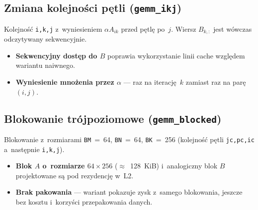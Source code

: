 \documentclass[a4paper,12pt]{book} %
\newcommand{\kod}[1]{\texttt{#1}}
\begin{document}
\subsection{Zmiana kolejności pętli (\kod{gemm\_ikj})}
Kolejność \kod{i,k,j} z~wyniesieniem $\alpha A_{ik}$ przed pętlę po~$j$. Wiersz
$B_{k,:}$ jest wówczas odczytywany sekwencyjnie.
\begin{itemize}
\item \textbf{Sekwencyjny dostęp do $B$} poprawia wykorzystanie linii cache
  względem wariantu naiwnego.
\item \textbf{Wyniesienie mnożenia przez $\alpha$} --- raz na iterację~$k$ zamiast
  raz na parę $(i,j)$.
\end{itemize}

\subsection{Blokowanie trójpoziomowe (\kod{gemm\_blocked})}
Blokowanie z~rozmiarami \kod{BM}~=~64, \kod{BN}~=~64, \kod{BK}~=~256 (kolejność
pętli \kod{jc,pc,ic} a~następnie \kod{i,k,j}).
\begin{itemize}
\item \textbf{Blok $A$ o~rozmiarze $64\times256$} ($\approx$~128~KiB) i~analogiczny
  blok $B$ projektowane są pod rezydencję w~L2.
\item \textbf{Brak pakowania} --- wariant pokazuje zysk z~samego blokowania,
  jeszcze bez kosztu i~korzyści przepakowania danych.
\end{itemize}
\end{document}

